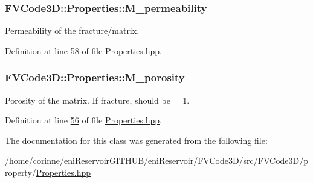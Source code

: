\subsubsection[{\texorpdfstring{M\+\_\+permeability}{M_permeability}}]{ F\+V\+Code3\+D\+::\+Properties\+::\+M\+\_\+permeability}\hypertarget{classFVCode3D_1_1Properties_a0689b2e6e4e5cb23ba4553ac78abe2bd}{}\label{classFVCode3D_1_1Properties_a0689b2e6e4e5cb23ba4553ac78abe2bd}


Permeability of the fracture/matrix. 



Definition at line \hyperlink{Properties_8hpp_source_l00058}{58} of file \hyperlink{Properties_8hpp_source}{Properties.\+hpp}.

\subsubsection[{\texorpdfstring{M\+\_\+porosity}{M_porosity}}]{ F\+V\+Code3\+D\+::\+Properties\+::\+M\+\_\+porosity}\hypertarget{classFVCode3D_1_1Properties_a22632d3f1cb4769e409c6d3bc84893d8}{}\label{classFVCode3D_1_1Properties_a22632d3f1cb4769e409c6d3bc84893d8}


Porosity of the matrix. If fracture, should be = 1. 



Definition at line \hyperlink{Properties_8hpp_source_l00056}{56} of file \hyperlink{Properties_8hpp_source}{Properties.\+hpp}.



The documentation for this class was generated from the following file\+:\begin{DoxyCompactItemize}
\item 
/home/corinne/eni\+Reservoir\+G\+I\+T\+H\+U\+B/eni\+Reservoir/\+F\+V\+Code3\+D/src/\+F\+V\+Code3\+D/property/\hyperlink{Properties_8hpp}{Properties.\+hpp}\end{DoxyCompactItemize}
